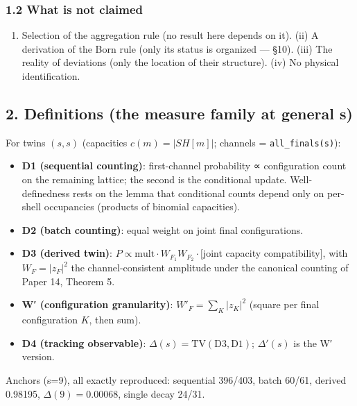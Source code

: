 \documentclass[
]{ltjsarticle}
\providecommand{\tightlist}{%
  \setlength{\itemsep}{0pt}\setlength{\parskip}{0pt}}
\begin{document}
\subsubsection{1.2 What is not claimed}\label{what-is-not-claimed}

\begin{enumerate}
\def\labelenumi{(\roman{enumi})}
\tightlist
\item
  Selection of the aggregation rule (no result here depends on it). (ii)
  A derivation of the Born rule (only its status is organized --- §10).
  (iii) The reality of deviations (only the location of their
  structure). (iv) No physical identification.
\end{enumerate}

\subsection{2. Definitions (the measure family at general
s)}\label{definitions-the-measure-family-at-general-s}

For twins \((s,s)\) (capacities \(c(m)=|SH[m]|\); channels =
\texttt{all\_finals(s)}):

\begin{itemize}
\tightlist
\item
  \textbf{D1 (sequential counting)}: first-channel probability ∝
  configuration count on the remaining lattice; the second is the
  conditional update. Well-definedness rests on the lemma that
  conditional counts depend only on per-shell occupancies (products of
  binomial capacities).
\item
  \textbf{D2 (batch counting)}: equal weight on joint final
  configurations.
\item
  \textbf{D3 (derived twin)}:
  \(P\propto \mathrm{mult}\cdot W_{F_1}W_{F_2}\cdot[\)joint capacity
  compatibility\(]\), with \(W_F=|z_F|^2\) the channel-consistent
  amplitude under the canonical counting of Paper 14, Theorem 5.
\item
  \textbf{W′ (configuration granularity)}: \(W'_F=\sum_K|z_K|^2\)
  (square per final configuration \(K\), then sum).
\item
  \textbf{D4 (tracking observable)}:
  \(\Delta(s)=\mathrm{TV}(\text{D3},\text{D1})\); \(\Delta'(s)\) is the
  W′ version.
\end{itemize}

Anchors (s=9), all exactly reproduced: sequential 396/403, batch 60/61,
derived 0.98195, \(\Delta(9)=0.00068\), single decay 24/31.
\end{document}
